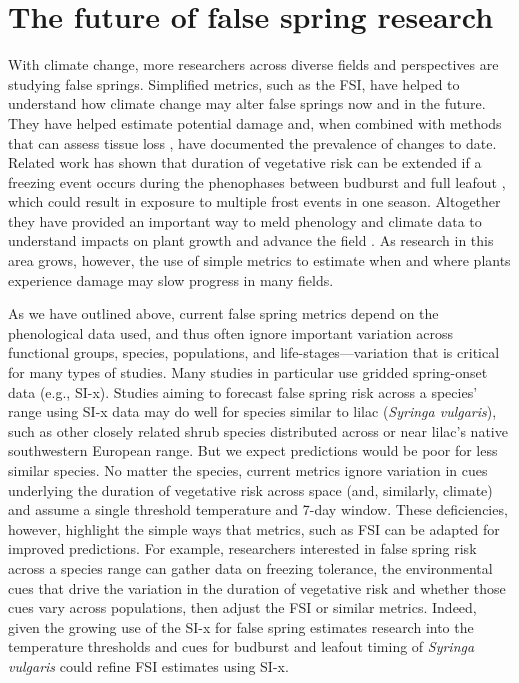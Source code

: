 \documentclass{article}\usepackage[]{graphicx}\usepackage[]{color}
\begin{document}
\section*{The future of false spring research}
With climate change, more researchers across diverse fields and perspectives are studying false springs. Simplified metrics, such as the FSI, have helped to understand how climate change may alter false springs now and in the future. They have helped estimate potential damage and, when combined with methods that can assess tissue loss \citep[e.g., PhenoCam images can capture initial greenup, defoliation due to frost or herbivory, then refoliation,][]{Richardson2018b}, have documented the prevalence of changes to date. Related work has shown that duration of vegetative risk can be extended if a freezing event occurs during the phenophases between budburst and full leafout \citep{Augspurger2009}, which could result in exposure to multiple frost events in one season. Altogether they have provided an important way to meld phenology and climate data to understand impacts on plant growth and advance the field \citep{Allstadt2015, Ault2015, Liu2018, Peterson2014}. As research in this area grows, however, the use of simple metrics to estimate when and where plants experience damage may slow progress in many fields. 

As we have outlined above, current false spring metrics depend on the phenological data used, and thus often ignore important variation across functional groups, species, populations, and life-stages---variation that is critical for many types of studies. Many studies in particular use gridded spring-onset data (e.g., SI-x). Studies aiming to forecast false spring risk across a species' range using SI-x data may do well for species similar to lilac (\emph{Syringa vulgaris}), such as other closely related shrub species distributed across or near lilac's native southwestern European range. But we expect predictions would be poor for less similar species. No matter the species, current metrics ignore variation in cues underlying the duration of vegetative risk across space (and, similarly, climate) and assume a single threshold temperature and 7-day window. These deficiencies, however, highlight the simple ways that metrics, such as FSI can be adapted for improved predictions. For example, researchers interested in false spring risk across a species range can gather data on freezing tolerance, the environmental cues that drive the variation in the duration of vegetative risk and whether those cues vary across populations, then adjust the FSI or similar metrics. Indeed, given the growing use of the SI-x for false spring estimates research into the temperature thresholds and cues for budburst and leafout timing of \emph{Syringa vulgaris} could refine FSI estimates using SI-x. 
\end{document}
